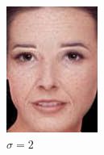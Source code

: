 \begin{figure}[t]
\begin{subfigure}[t]{0.2\textwidth}
		\includegraphics[width=\textwidth]{gandhi/sim2.png}
		\caption{$\sigma = 2$ }
	\end{subfigure}
	\begin{subfigure}[t]{0.2\textwidth}

\end{subfigure}
\end{figure}

